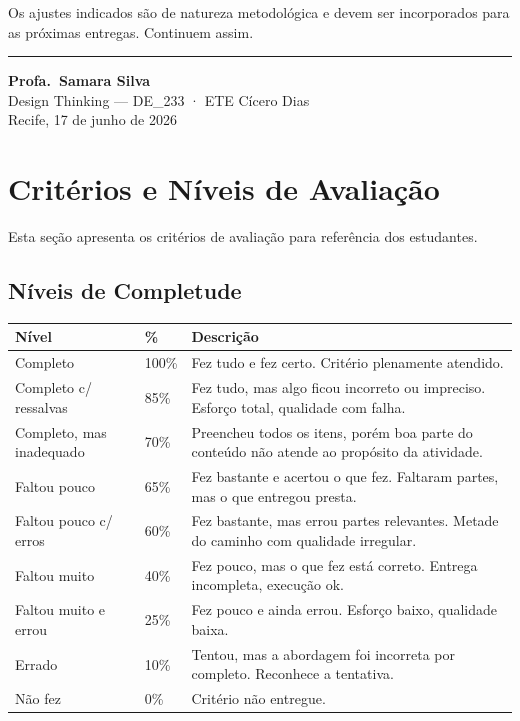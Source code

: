 \documentclass[
  sigconf,
  nonacm, %
  language=portuguese
]{acmart}
\begin{document}
Os ajustes indicados são de natureza metodológica e devem ser
incorporados para as próximas entregas.
Continuem assim.


\vspace{1.5em}
\noindent\rule{\linewidth}{0.4pt}

\begin{flushright}
\textbf{Profa.\ Samara Silva}\\
{\small\color{cmuted} Design Thinking --- DE\_233 · ETE Cícero Dias}\\
{\small\color{cmuted} Recife, 17 de junho de 2026}
\end{flushright}


\appendix
\onecolumn
\section{Critérios e Níveis de Avaliação}

Esta seção apresenta os critérios de avaliação para referência dos estudantes.

\subsection{Níveis de Completude}

\begin{tabularx}{\linewidth}{@{} p{4cm} p{1.5cm} X @{}}
\toprule
\textbf{Nível} & \textbf{\%} & \textbf{Descrição} \\
\midrule
Completo & 100\% & Fez tudo e fez certo. Critério plenamente atendido. \\
Completo c/ ressalvas & 85\% & Fez tudo, mas algo ficou incorreto ou impreciso. Esforço total, qualidade com falha. \\
Completo, mas inadequado & 70\% & Preencheu todos os itens, porém boa parte do conteúdo não atende ao propósito da atividade. \\
Faltou pouco & 65\% & Fez bastante e acertou o que fez. Faltaram partes, mas o que entregou presta. \\
Faltou pouco c/ erros & 60\% & Fez bastante, mas errou partes relevantes. Metade do caminho com qualidade irregular. \\
Faltou muito & 40\% & Fez pouco, mas o que fez está correto. Entrega incompleta, execução ok. \\
Faltou muito e errou & 25\% & Fez pouco e ainda errou. Esforço baixo, qualidade baixa. \\
Errado & 10\% & Tentou, mas a abordagem foi incorreta por completo. Reconhece a tentativa. \\
Não fez & 0\% & Critério não entregue. \\
\bottomrule
\end{tabularx}
\end{document}
